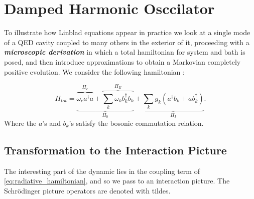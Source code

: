 \section{Damped Harmonic Osccilator}
To illustrate how Linblad equations appear in practice we look at a single mode of a QED cavity coupled to many others in the exterior of it,
proceeding with a \textbf{\textit{microscopic derivation}} in which a total hamiltonian for system and bath is posed,  and then introduce
approximations to obtain a Markovian completely positive evolution. We consider the following hamiltonian
\cite{wiseman_quantum_2010,walls_quantum_2008}:

\begin{equation}\label{eq:radiative_hamiltonian}
H_{tot} = \underbrace{\overbrace{\omega_{c} a^{\dagger}a}^{H_{c}} + \overbrace{\sum_{k}\omega_{k}b^{\dagger}_{k}b_{k}}^{H_{E}} }_{H_{0}}+ \underbrace{\sum_{k}g_{k}\left( a^{\dagger}b_{k} + ab^{\dagger}_{k} \right)}_{H_{I}}.
\end{equation}
Where the $a$'s and $b_k$'s satisfy the bosonic commutation relation.
\subsection{Transformation to the Interaction Picture}
The interesting part of the dynamic lies in the coupling term of \eqref{eq:radiative_hamiltonian}, and so we pass to an interaction picture. The
Schr{\"o}dinger picture operators are denoted with tildes.

